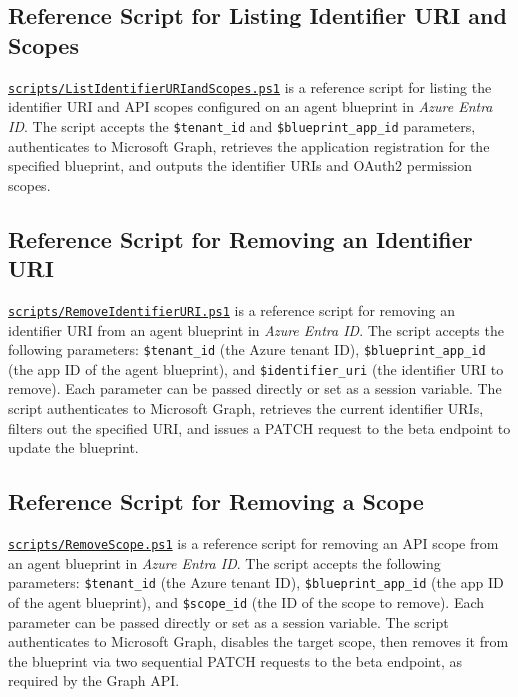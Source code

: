 \documentclass[9pt]{extarticle}%
\begin{document}
\subsection{Reference Script for Listing Identifier URI and Scopes}%
\href{https://github.com/dennisseah/agent-identity/blob/main/scripts/ListIdentifierURIandScopes.ps1}{\texttt{scripts/ListIdentifierURIandScopes.ps1}} is a reference script for listing the identifier URI and API scopes configured on an agent blueprint in \textit{Azure Entra ID}. The script accepts the \texttt{\$tenant\_id} and \texttt{\$blueprint\_app\_id} parameters, authenticates to Microsoft Graph, retrieves the application registration for the specified blueprint, and outputs the identifier URIs and OAuth2 permission scopes.
%
\par\vspace{\baselineskip}%
\subsection{Reference Script for Removing an Identifier URI}%
\href{https://github.com/dennisseah/agent-identity/blob/main/scripts/RemoveIdentifierURI.ps1}{\texttt{scripts/RemoveIdentifierURI.ps1}} is a reference script for removing an identifier URI from an agent blueprint in \textit{Azure Entra ID}. The script accepts the following parameters: \texttt{\$tenant\_id} (the Azure tenant ID), \texttt{\$blueprint\_app\_id} (the app ID of the agent blueprint), and \texttt{\$identifier\_uri} (the identifier URI to remove). Each parameter can be passed directly or set as a session variable. The script authenticates to Microsoft Graph, retrieves the current identifier URIs, filters out the specified URI, and issues a PATCH request to the beta endpoint to update the blueprint.
%
\par\vspace{\baselineskip}%
\subsection{Reference Script for Removing a Scope}%
\href{https://github.com/dennisseah/agent-identity/blob/main/scripts/RemoveScope.ps1}{\texttt{scripts/RemoveScope.ps1}} is a reference script for removing an API scope from an agent blueprint in \textit{Azure Entra ID}. The script accepts the following parameters: \texttt{\$tenant\_id} (the Azure tenant ID), \texttt{\$blueprint\_app\_id} (the app ID of the agent blueprint), and \texttt{\$scope\_id} (the ID of the scope to remove). Each parameter can be passed directly or set as a session variable. The script authenticates to Microsoft Graph, disables the target scope, then removes it from the blueprint via two sequential PATCH requests to the beta endpoint, as required by the Graph API.
%
\par\vspace{\baselineskip}%
\end{document}
